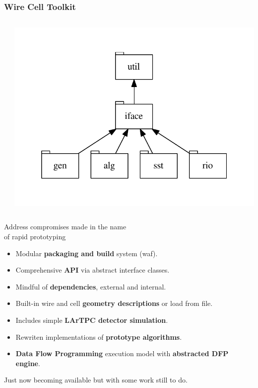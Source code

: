 \begin{frame}
  \frametitle{Wire Cell Toolkit}

  \begin{columns}
    \begin{column}{0.65\paperwidth}
    \end{column}
    \begin{column}{0.35\paperwidth}
      \vspace{-20mm}
      \includegraphics[width=\textwidth]{deps.pdf}      
    \end{column}
  \end{columns}

  \vspace{-15mm}

  Address compromises made in the name\\
  of rapid prototyping 
  \begin{itemize}
  \item Modular \textbf{packaging and build} system (waf).
  \item Comprehensive \textbf{API} via abstract interface classes.
  \item Mindful of \textbf{dependencies}, external and internal.
  \item Built-in wire and cell \textbf{geometry descriptions} or load from file.
  \item Includes simple \textbf{LArTPC detector simulation}.
  \item Rewriten implementations of \textbf{prototype algorithms}.
  \item \textbf{Data Flow Programming} execution model with \textbf{abstracted DFP engine}.
  \end{itemize}

  \vfill

  Just now becoming available but with some work still to do.

\end{frame}

